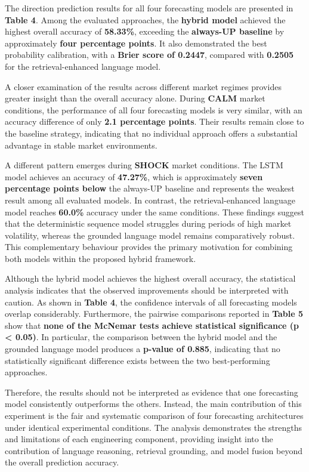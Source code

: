The direction prediction results for all four forecasting models are
presented in \textbf{Table 4}. Among the evaluated approaches, the
\textbf{hybrid model} achieved the highest overall accuracy of
\textbf{58.33\%}, exceeding the \textbf{always-UP baseline} by
approximately \textbf{four percentage points}. It also demonstrated the
best probability calibration, with a \textbf{Brier score of 0.2447},
compared with \textbf{0.2505} for the retrieval-enhanced language model.

A closer examination of the results across different market regimes
provides greater insight than the overall accuracy alone. During
\textbf{CALM} market conditions, the performance of all four forecasting
models is very similar, with an accuracy difference of only \textbf{2.1
percentage points}. Their results remain close to the baseline strategy,
indicating that no individual approach offers a substantial advantage in
stable market environments.

A different pattern emerges during \textbf{SHOCK} market conditions. The
LSTM model achieves an accuracy of \textbf{47.27\%}, which is
approximately \textbf{seven percentage points below} the always-UP
baseline and represents the weakest result among all evaluated models.
In contrast, the retrieval-enhanced language model reaches
\textbf{60.0\%} accuracy under the same conditions. These findings
suggest that the deterministic sequence model struggles during periods
of high market volatility, whereas the grounded language model remains
comparatively robust. This complementary behaviour provides the primary
motivation for combining both models within the proposed hybrid
framework.

Although the hybrid model achieves the highest overall accuracy, the
statistical analysis indicates that the observed improvements should be
interpreted with caution. As shown in \textbf{Table 4}, the confidence
intervals of all forecasting models overlap considerably. Furthermore,
the pairwise comparisons reported in \textbf{Table 5} show that
\textbf{none of the McNemar tests achieve statistical significance (p
\textless{} 0.05)}. In particular, the comparison between the hybrid
model and the grounded language model produces a \textbf{p-value of
0.885}, indicating that no statistically significant difference exists
between the two best-performing approaches.

Therefore, the results should not be interpreted as evidence that one
forecasting model consistently outperforms the others. Instead, the main
contribution of this experiment is the fair and systematic comparison of
four forecasting architectures under identical experimental conditions.
The analysis demonstrates the strengths and limitations of each
engineering component, providing insight into the contribution of
language reasoning, retrieval grounding, and model fusion beyond the
overall prediction accuracy.

